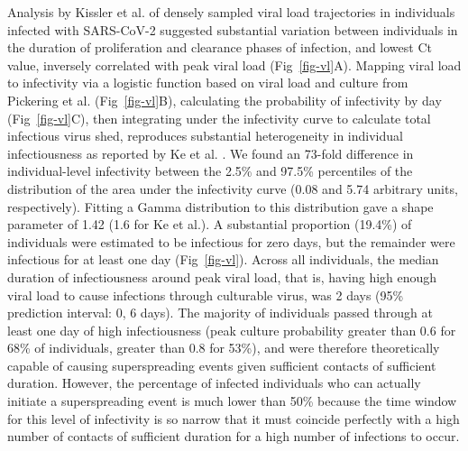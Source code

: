 \documentclass[
  10pt,
  letterpaper,
]{article}
\begin{document}
Analysis by Kissler et al. \citep{kissler2021} of densely sampled viral
load trajectories in individuals infected with SARS-CoV-2 suggested
substantial variation between individuals in the duration of
proliferation and clearance phases of infection, and lowest Ct value,
inversely correlated with peak viral load (Fig~\ref{fig-vl}A). Mapping
viral load to infectivity via a logistic function based on viral load
and culture from Pickering et al. \citep{pickering2021}
(Fig~\ref{fig-vl}B), calculating the probability of infectivity by day
(Fig~\ref{fig-vl}C), then integrating under the infectivity curve to
calculate total infectious virus shed, reproduces substantial
heterogeneity in individual infectiousness as reported by Ke et al.
\citep{ke2022}. We found an 73-fold difference in individual-level
infectivity between the 2.5\% and 97.5\% percentiles of the distribution
of the area under the infectivity curve (0.08 and 5.74 arbitrary units,
respectively). Fitting a Gamma distribution to this distribution gave a
shape parameter of 1.42 (1.6 for Ke et al.). A substantial proportion
(19.4\%) of individuals were estimated to be infectious for zero days,
but the remainder were infectious for at least one day
(Fig~\ref{fig-vl}). Across all individuals, the median duration of
infectiousness around peak viral load, that is, having high enough viral
load to cause infections through culturable virus, was 2 days (95\%
prediction interval: 0, 6 days). The majority of individuals passed
through at least one day of high infectiousness (peak culture
probability greater than 0.6 for 68\% of individuals, greater than 0.8
for 53\%), and were therefore theoretically capable of causing
superspreading events given sufficient contacts of sufficient duration.
However, the percentage of infected individuals who can actually
initiate a superspreading event is much lower than 50\% because the time
window for this level of infectivity is so narrow that it must coincide
perfectly with a high number of contacts of sufficient duration for a
high number of infections to occur.
\end{document}
